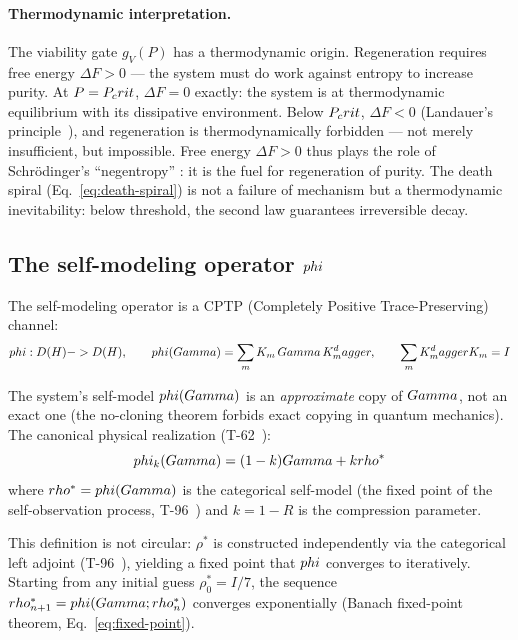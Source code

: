 \paragraph{Thermodynamic interpretation.}
The viability gate $g_V(P)$ has a thermodynamic origin. Regeneration requires free energy
$\Delta F > 0$ --- the system must do work against entropy to increase purity. At $P = P_crit$,
$\Delta F = 0$ exactly: the system is at thermodynamic equilibrium with its dissipative
environment. Below $P_crit$, $\Delta F < 0$ (Landauer's principle~\cite{landauer1961}),
and regeneration is thermodynamically forbidden --- not merely insufficient, but impossible.
Free energy $\Delta F > 0$ thus plays the role of Schr\"{o}dinger's ``negentropy''
\cite{schrodinger1944}: it is the fuel for regeneration of purity. The death spiral
(Eq.~\ref{eq:death-spiral}) is not a failure of mechanism but a thermodynamic
inevitability: below threshold, the second law guarantees irreversible decay.

\subsection{The self-modeling operator $phi$}
\label{subsec:phi-operator}

\begin{definition}
The self-modeling operator is a CPTP (Completely Positive Trace-Preserving) channel:
\begin{equation}
  phi: D(H) -> D(H), \qquad
  phi(Gamma) = \sum_m K_m\, Gamma\, K_m^dagger, \qquad
  \sum_m K_m^dagger K_m = I
  \label{eq:phi-operator}
\end{equation}
\end{definition}

The system's self-model $phi(Gamma)$ is an \emph{approximate} copy of $Gamma$, not an exact
one (the no-cloning theorem forbids exact copying in quantum mechanics). The canonical
physical realization (T-62~):
\begin{equation}
  phi_k(Gamma) = (1-k)Gamma + krho^*
  \label{eq:phi-physical}
\end{equation}
where $rho^* = phi(Gamma)$ is the categorical self-model (the fixed point of the
self-observation process, T-96~) and $k = 1 - R$ is the compression parameter.

This definition is not circular: $\rho^*$ is constructed independently via the categorical left adjoint (T-96~), yielding a fixed point that $phi$ converges to iteratively. Starting from any initial guess $\rho^*_0 = I/7$, the sequence $rho^*_{n+1} = phi(Gamma; rho^*_n)$ converges exponentially (Banach fixed-point theorem, Eq.~\ref{eq:fixed-point}).

